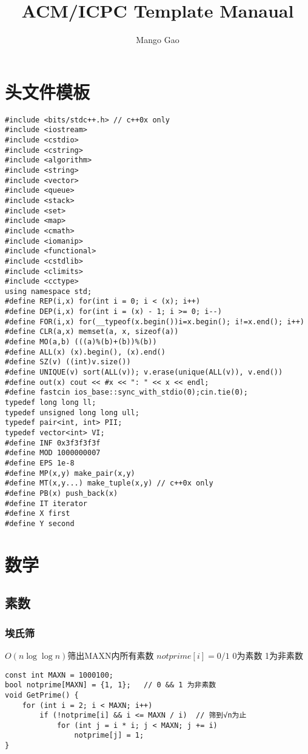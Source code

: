 \documentclass[a4]{article}
\title{ACM/ICPC Template Manaual}
\author{Mango Gao}
\begin{document}
\large
\begin{titlepage}
\maketitle
\end{titlepage}
\clearpage
\tableofcontents
\clearpage
\section{头文件模板}
\begin{lstlisting}
#include <bits/stdc++.h> // c++0x only
#include <iostream>
#include <cstdio>
#include <cstring>
#include <algorithm>
#include <string>
#include <vector>
#include <queue>
#include <stack>
#include <set>
#include <map>
#include <cmath>
#include <iomanip>
#include <functional>
#include <cstdlib>
#include <climits>
#include <cctype>
using namespace std;
#define REP(i,x) for(int i = 0; i < (x); i++)
#define DEP(i,x) for(int i = (x) - 1; i >= 0; i--)
#define FOR(i,x) for(__typeof(x.begin())i=x.begin(); i!=x.end(); i++)
#define CLR(a,x) memset(a, x, sizeof(a))
#define MO(a,b) (((a)%(b)+(b))%(b))
#define ALL(x) (x).begin(), (x).end()
#define SZ(v) ((int)v.size())
#define UNIQUE(v) sort(ALL(v)); v.erase(unique(ALL(v)), v.end())
#define out(x) cout << #x << ": " << x << endl;
#define fastcin ios_base::sync_with_stdio(0);cin.tie(0);
typedef long long ll;
typedef unsigned long long ull;
typedef pair<int, int> PII;
typedef vector<int> VI;
#define INF 0x3f3f3f3f
#define MOD 1000000007
#define EPS 1e-8
#define MP(x,y) make_pair(x,y)
#define MT(x,y...) make_tuple(x,y) // c++0x only
#define PB(x) push_back(x)
#define IT iterator
#define X first
#define Y second
\end{lstlisting}
\clearpage
\section{数学}
\subsection{素数}
\subsubsection{埃氏筛}
$O(n\log\log n)$筛出MAXN内所有素数
$notprime[i] = 0/1$ 0为素数 1为非素数\begin{lstlisting}
const int MAXN = 1000100;
bool notprime[MAXN] = {1, 1};	// 0 && 1 为非素数
void GetPrime() {
	for (int i = 2; i < MAXN; i++)
		if (!notprime[i] && i <= MAXN / i)	// 筛到√n为止
			for (int j = i * i; j < MAXN; j += i)
				notprime[j] = 1;
}
\end{lstlisting}
\end{document}
